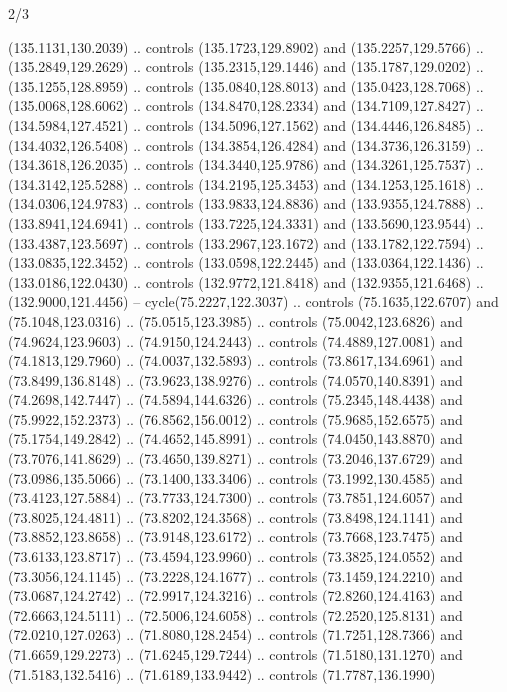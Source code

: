 \begin{flagdescription}{2/3}
\begin{scope}[shift={(0.5\flaglength,0.5)},scale=\flagwidth/320]
\begin{scope}[y=0.8pt, x=0.8pt, yscale=-1,shift={(-118.3,-146)}]
  (135.1131,130.2039) .. controls (135.1723,129.8902) and (135.2257,129.5766) ..
  (135.2849,129.2629) .. controls (135.2315,129.1446) and (135.1787,129.0202) ..
  (135.1255,128.8959) .. controls (135.0840,128.8013) and (135.0423,128.7068) ..
  (135.0068,128.6062) .. controls (134.8470,128.2334) and (134.7109,127.8427) ..
  (134.5984,127.4521) .. controls (134.5096,127.1562) and (134.4446,126.8485) ..
  (134.4032,126.5408) .. controls (134.3854,126.4284) and (134.3736,126.3159) ..
  (134.3618,126.2035) .. controls (134.3440,125.9786) and (134.3261,125.7537) ..
  (134.3142,125.5288) .. controls (134.2195,125.3453) and (134.1253,125.1618) ..
  (134.0306,124.9783) .. controls (133.9833,124.8836) and (133.9355,124.7888) ..
  (133.8941,124.6941) .. controls (133.7225,124.3331) and (133.5690,123.9544) ..
  (133.4387,123.5697) .. controls (133.2967,123.1672) and (133.1782,122.7594) ..
  (133.0835,122.3452) .. controls (133.0598,122.2445) and (133.0364,122.1436) ..
  (133.0186,122.0430) .. controls (132.9772,121.8418) and (132.9355,121.6468) ..
  (132.9000,121.4456) -- cycle(75.2227,122.3037) .. controls (75.1635,122.6707)
  and (75.1048,123.0316) .. (75.0515,123.3985) .. controls (75.0042,123.6826)
  and (74.9624,123.9603) .. (74.9150,124.2443) .. controls (74.4889,127.0081)
  and (74.1813,129.7960) .. (74.0037,132.5893) .. controls (73.8617,134.6961)
  and (73.8499,136.8148) .. (73.9623,138.9276) .. controls (74.0570,140.8391)
  and (74.2698,142.7447) .. (74.5894,144.6326) .. controls (75.2345,148.4438)
  and (75.9922,152.2373) .. (76.8562,156.0012) .. controls (75.9685,152.6575)
  and (75.1754,149.2842) .. (74.4652,145.8991) .. controls (74.0450,143.8870)
  and (73.7076,141.8629) .. (73.4650,139.8271) .. controls (73.2046,137.6729)
  and (73.0986,135.5066) .. (73.1400,133.3406) .. controls (73.1992,130.4585)
  and (73.4123,127.5884) .. (73.7733,124.7300) .. controls (73.7851,124.6057)
  and (73.8025,124.4811) .. (73.8202,124.3568) .. controls (73.8498,124.1141)
  and (73.8852,123.8658) .. (73.9148,123.6172) .. controls (73.7668,123.7475)
  and (73.6133,123.8717) .. (73.4594,123.9960) .. controls (73.3825,124.0552)
  and (73.3056,124.1145) .. (73.2228,124.1677) .. controls (73.1459,124.2210)
  and (73.0687,124.2742) .. (72.9917,124.3216) .. controls (72.8260,124.4163)
  and (72.6663,124.5111) .. (72.5006,124.6058) .. controls (72.2520,125.8131)
  and (72.0210,127.0263) .. (71.8080,128.2454) .. controls (71.7251,128.7366)
  and (71.6659,129.2273) .. (71.6245,129.7244) .. controls (71.5180,131.1270)
  and (71.5183,132.5416) .. (71.6189,133.9442) .. controls (71.7787,136.1990)

\end{scope}
\end{scope}
\end{flagdescription}
